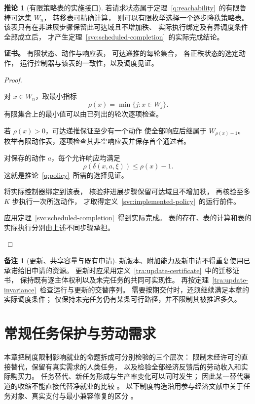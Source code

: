 \documentclass[UTF8,12pt,a4paper,openany,fontset=none,zihao=false]{ctexrep}
\theoremstyle{definition}
\newtheorem{corollary}{推论}[chapter]
\newtheorem{remark}{备注}[chapter]
\newenvironment{certificate}{\par\noindent\textbf{证书。}\ignorespaces}{\par}
\newcommand{\1}{\mathbf 1}
\begin{document}
\begin{corollary}[有限策略表的实施接口]
\label{svc:finite-policy}
若请求状态属于定理~\ref{q:reachability}~的有限鲁棒可达集 \(W_n\)，
转移表可精确计算，
则可以有限枚举选择一个逐步降秩策略表。
该表只有在非进展步骤保留此可达域且不增加秩、
实际执行绑定及有界调度条件全部成立后，
才产生定理~\ref{svc:scheduled-completion}~的实际完成结论。
\end{corollary}
\begin{certificate}
有限状态、动作与响应表，
可达递推的每轮集合，
各正秩状态的选定动作，
运行控制器与该表的一致性，以及调度见证。
\end{certificate}
\begin{proof}
\begin{semanticsteps}
\item 对 \(x\in W_n\)，取最小指标
\[
\rho(x)=\min\{j:x\in W_j\}.
\]
有限集合上的最小值可以由已列出的轮次逐项检查。
\item 若 \(\rho(x)>0\)，可达递推保证至少有一个动作
使全部响应后继属于 \(W_{\rho(x)-1}\)。
枚举有限动作表，逐项检查其非空响应表并保存首个通过者。
\item 对保存的动作 \(a\)，每个允许响应均满足
\[
\rho(\delta(x,a,\xi))\le\rho(x)-1.
\]
这就是推论~\ref{q:policy}~所需的选择见证。
\item 将实际控制器绑定到该表，
核验非进展步骤保留可达域且不增加秩，
再核验至多 \(K\) 步执行一次所选动作，
才取得定义~\ref{svc:implemented-policy}~的运行前件。
\item 应用定理~\ref{svc:scheduled-completion}~得到实际完成。
表的存在、表的计算和表的实际执行分别由上述不同步骤承担。
\end{semanticsteps}
\end{proof}

\begin{remark}[更新、共享容量与既有申请]
新版本、附加能力及新申请不得重复使用已承诺给旧申请的资源。
更新时应采用定义~\ref{tra:update-certificate}~中的迁移证书，
保持既有逐主体权利以及未完任务的共同可实现性。
再按定理~\ref{tra:update-invariance}~检查运行与更新的交替序列。
需要按期交付时，还须继续满足本章的实际调度条件；
仅保持未完任务仍有某条可行路径，并不限制其被推迟多久。
\end{remark}


\chapter{常规任务保护与劳动需求}
\label{lab:chapter}

本章把制度限制影响就业的命题拆成可分别检验的三个层次：
限制未经许可的直接替代，保留有真实需求的人类任务，
以及检验全部经济反馈后的劳动收入和实际购买力。
任务替代、新任务形成与生产率变化可以同时发生；
因此某一替代渠道的收缩不能直接代替净就业的比较
\cite{AcemogluRestrepo2019,Autor2015}。
以下制度构造沿用参与经济文献中关于任务对象、真实支付与最小兼容修复的区分
\cite{InternalEconomics}。
\end{document}

